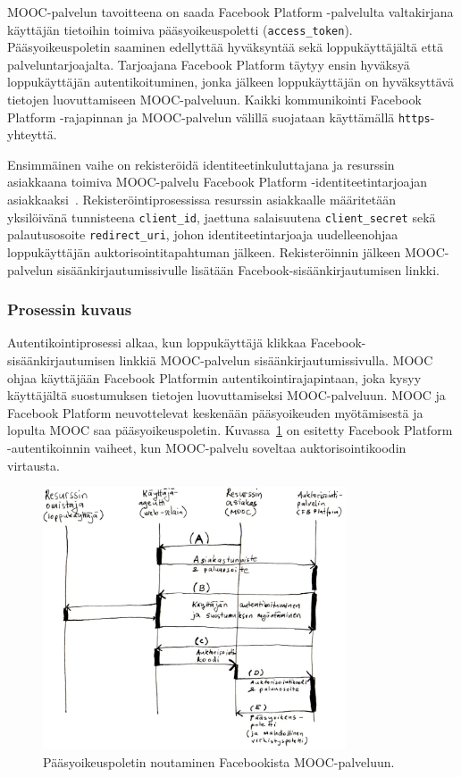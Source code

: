\documentclass[finnish,gradu]{tktltiki}
\begin{document}
  MOOC-palvelun tavoitteena on saada Facebook Platform -palvelulta valtakirjana käyttäjän tietoihin toimiva pääsyoikeuspoletti (\verb!access_token!). Pääsyoikeuspoletin saaminen edellyttää hyväksyntää sekä loppukäyttäjältä että palveluntarjoajalta. Tarjoajana Facebook Platform täytyy ensin hyväksyä loppukäyttäjän autentikoituminen, jonka jälkeen loppukäyttäjän on hyväksyttävä tietojen luovuttamiseen MOOC-palveluun. Kaikki kommunikointi Facebook Platform -rajapinnan ja MOOC-palvelun välillä suojataan käyttämällä \verb!https!-yhteyttä.

  Ensimmäinen vaihe on rekisteröidä identiteetinkuluttajana ja resurssin asiakkaana toimiva MOOC-palvelu Facebook Platform -identiteetintarjoajan asiakkaaksi~\cite{facebook_oauth2_doc}. Rekisteröintiprosessissa resurssin asiakkaalle määritetään yksilöivänä tunnisteena \verb!client_id!, jaettuna salaisuutena \verb!client_secret! sekä palautusosoite \verb!redirect_uri!, johon identiteetintarjoaja uudelleenohjaa loppukäyttäjän auktorisointitapahtuman jälkeen. Rekisteröinnin jälkeen MOOC-palvelun sisäänkirjautumissivulle lisätään Facebook-sisäänkirjautumisen linkki.


  \subsubsection{Prosessin kuvaus} %
  \label{ssub:autentikoinnin_vaiheet_facebook_platform_palveluun}

  Autentikointiprosessi alkaa, kun loppukäyttäjä klikkaa Facebook-sisäänkirjautumisen linkkiä MOOC-palvelun sisäänkirjautumissivulla. MOOC ohjaa käyttäjään Facebook Platformin autentikointirajapintaan, joka kysyy käyttäjältä suostumuksen tietojen luovuttamiseksi MOOC-palveluun. MOOC ja Facebook Platform neuvottelevat keskenään pääsyoikeuden myötämisestä ja lopulta MOOC saa pääsyoikeuspoletin. Kuvassa~\ref{fig:oauth_auth_code_flow} on esitetty Facebook Platform -autentikoinnin vaiheet, kun MOOC-palvelu soveltaa auktorisointikoodin virtausta.


  \begin{figure}
    \centering
    \includegraphics[width=0.8\textwidth]{images/fb_auth_sekvenssi.jpg}
    \caption{Pääsyoikeuspoletin noutaminen Facebookista MOOC-palveluun.}
    \label{fig:oauth_auth_code_flow}
  \end{figure}
\end{document}
